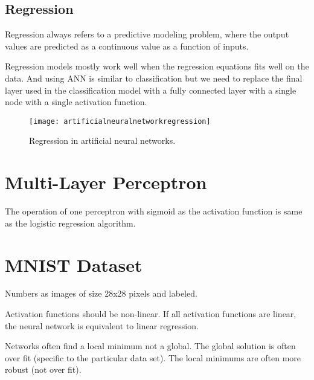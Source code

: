 	\subsection{Regression}
	\begin{bulletedlist}
		\item Regression always refers to a predictive modeling problem, where the output values are predicted as a continuous value as a function of inputs.
		\item Regression models mostly work well when the regression equations fits well on the data.  And using ANN is similar to classification but we need to replace the final layer used in the classification model with a fully connected layer with a single node with a single activation function.
	\end{bulletedlist}
 	\begin{figure}[htb]
		\centering
		\texttt{[image: artificialneuralnetworkregression]}
		\caption[Regression in artificial neural networks]{Regression in artificial neural networks.}
		\label{fig:artificialneuralnetworkregression}
	\end{figure}

	\section{Multi-Layer Perceptron}

	\begin{bulletedlist}
		\item The operation of one perceptron with sigmoid as the activation function is same as the logistic regression algorithm.
	\end{bulletedlist}

	\section{MNIST Dataset}
	\begin{bulletedlist}
		\item Numbers as images of size 28x28 pixels and labeled.
		\item Activation functions should be non-linear.  If all activation functions are linear, the neural network is equivalent to linear regression.
		\item Networks often find a local minimum not a global.  The global solution is often over fit (specific to the particular data set).  The local minimums are often more robust (not over fit).
	\end{bulletedlist}


